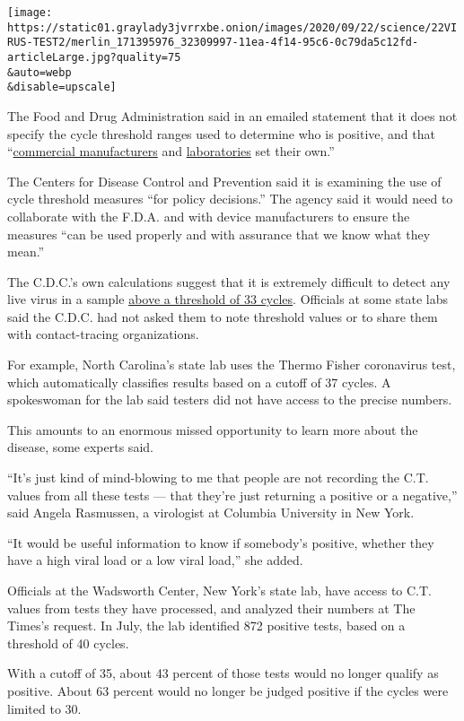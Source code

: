 \texttt{[image: https://static01.graylady3jvrrxbe.onion/images/2020/09/22/science/22VIRUS-TEST2/merlin\_171395976\_32309997-11ea-4f14-95c6-0c79da5c12fd-articleLarge.jpg?quality=75\\\&auto=webp\\\&disable=upscale]}

The Food and Drug Administration said in an emailed statement that it
does not specify the cycle threshold ranges used to determine who is
positive, and that
``\href{https://www.fda.gov/media/135900/download}{commercial
manufacturers} and
\href{https://www.fda.gov/media/135658/download}{laboratories} set their
own.''

The Centers for Disease Control and Prevention said it is examining the
use of cycle threshold measures ``for policy decisions.'' The agency
said it would need to collaborate with the F.D.A. and with device
manufacturers to ensure the measures ``can be used properly and with
assurance that we know what they mean.''

The C.D.C.'s own calculations suggest that it is extremely difficult to
detect any live virus in a sample
\href{https://www.cdc.gov/coronavirus/2019-ncov/hcp/duration-isolation.html}{above
a threshold of 33 cycles}. Officials at some state labs said the C.D.C.
had not asked them to note threshold values or to share them with
contact-tracing organizations.

For example, North Carolina's state lab uses the Thermo Fisher
coronavirus test, which automatically classifies results based on a
cutoff of 37 cycles. A spokeswoman for the lab said testers did not have
access to the precise numbers.

This amounts to an enormous missed opportunity to learn more about the
disease, some experts said.

``It's just kind of mind-blowing to me that people are not recording the
C.T. values from all these tests --- that they're just returning a
positive or a negative,'' said Angela Rasmussen, a virologist at
Columbia University in New York.

``It would be useful information to know if somebody's positive, whether
they have a high viral load or a low viral load,'' she added.

Officials at the Wadsworth Center, New York's state lab, have access to
C.T. values from tests they have processed, and analyzed their numbers
at The Times's request. In July, the lab identified 872 positive tests,
based on a threshold of 40 cycles.

With a cutoff of 35, about 43 percent of those tests would no longer
qualify as positive. About 63 percent would no longer be judged positive
if the cycles were limited to 30.

